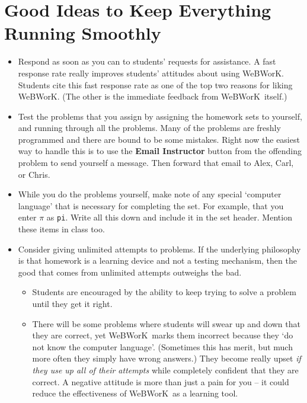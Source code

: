 \documentclass[12pt]{article}
\newcommand{\menu}[1]{\textbf{#1}}
\newcommand{\WW}{WeBWorK}
\begin{document}
\section{Good Ideas to Keep Everything Running Smoothly}\label{goodideas}

\begin{itemize}
\item Respond as soon as you can to students' requests for assistance.  A fast response rate really improves students' attitudes about using \WW.  Students cite this fast response rate as one of the top two reasons for liking \WW.  (The other is the immediate feedback from \WW\ itself.)

\item Test the problems that you assign by assigning the homework sets to yourself, and running through all the problems.  Many of the problems are freshly programmed and there are bound to be some mistakes.  Right now the easiest way to handle this is to use the \menu{Email Instructor} button from the offending problem to send yourself a message. Then forward that email to Alex, Carl, or Chris.

\item While you do the problems yourself, make note of any special `computer language' that is necessary for completing the set.  For example, that you enter $\pi$ as \texttt{pi}.  Write all this down and include it in the set header.  Mention these items in class too.
  
\item Consider giving unlimited attempts to problems.  If the underlying philosophy is that homework is a learning device and not a testing mechanism, then the good that comes from unlimited attempts outweighs the bad.
\begin{itemize}
\item Students are encouraged by the ability to keep trying to solve a problem until they get it right. 

\item There will be some problems where students will swear up and down that they are correct, yet \WW\ marks them incorrect because they `do not know the computer language'.  (Sometimes this has merit, but much more often they simply have wrong answers.)  They become really upset \emph{if they use up all of their attempts} while completely confident that they are correct.  A negative attitude is more than just a pain for you -- it could reduce the effectiveness of \WW\ as a learning tool.


\end{itemize}
\end{itemize}
\end{document}
